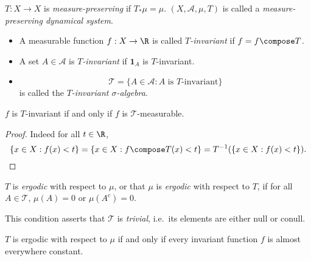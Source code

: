 \documentclass[a4paper]{article}
\begin{document}
\begin{definition}
  \(T: X \to X\) is \emph{measure-preserving} if \(T_*\mu = \mu\). \((X, \mathcal A, \mu, T)\) is called a \emph{measure-preserving dynamical system}.
\end{definition}

\begin{definition}\leavevmode
  \begin{itemize}
  \item A measurable function \(f: X \to \R\) is called \emph{\(T\)-invariant} if \(f = f \compose T\).
  \item A set \(A \in \mathcal A\) is \emph{\(T\)-invariant} if \(\mathbf 1_A\) is \(T\)-invariant.
  \item
    \[
      \mathcal T = \{A \in \mathcal A: A \text{ is \(T\)-invariant}\}
    \]
    is called the \emph{\(T\)-invariant \(\sigma\)-algebra}.
  \end{itemize}
\end{definition}

\begin{lemma}
  \(f\) is \(T\)-invariant if and only if \(f\) is \(\mathcal T\)-measurable.
\end{lemma}

\begin{proof}
  Indeed for all \(t \in \R\),
  \[
    \{x \in X: f(x) < t\}
    = \{x \in X: f \compose T (x) < t\}
    = T^{-1}(\{x \in X: f(x) < t\}).
  \]
\end{proof}

\begin{definition}[ergodic]
  \(T\) is \emph{ergodic} with respect to \(\mu\), or that \(\mu\) is \emph{ergodic} with respect to \(T\), if for all \(A \in \mathcal T\), \(\mu(A) = 0\) or \(\mu(A^c) = 0\).
\end{definition}

This condition asserts that \(\mathcal T\) is \emph{trivial}, i.e.\ its elements are either null or conull.

\begin{lemma}
  \(T\) is ergodic with respect to \(\mu\) if and only if  every invariant function \(f\) is almost everywhere constant.
\end{lemma}
\end{document}
